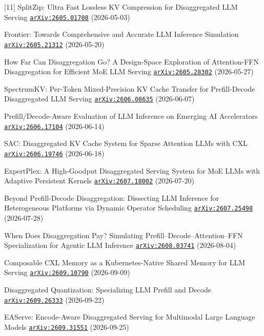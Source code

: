 [11] SplitZip: Ultra Fast Lossless KV Compression for Disaggregated LLM Serving \href{https://arxiv.org/abs/2605.01708}{\texttt{arXiv:2605.01708}} (2026-05-03)\par
[12] Frontier: Towards Comprehensive and Accurate LLM Inference Simulation \href{https://arxiv.org/abs/2605.21312}{\texttt{arXiv:2605.21312}} (2026-05-20)\par
[13] How Far Can Disaggregation Go? A Design-Space Exploration of Attention-FFN Disaggregation for Efficient MoE LLM Serving \href{https://arxiv.org/abs/2605.28302}{\texttt{arXiv:2605.28302}} (2026-05-27)\par
[14] SpectrumKV: Per-Token Mixed-Precision KV Cache Transfer for Prefill-Decode Disaggregated LLM Serving \href{https://arxiv.org/abs/2606.08635}{\texttt{arXiv:2606.08635}} (2026-06-07)\par
[15] Prefill/Decode-Aware Evaluation of LLM Inference on Emerging AI Accelerators \href{https://arxiv.org/abs/2606.17104}{\texttt{arXiv:2606.17104}} (2026-06-14)\par
[16] SAC: Disaggregated KV Cache System for Sparse Attention LLMs with CXL \href{https://arxiv.org/abs/2606.19746}{\texttt{arXiv:2606.19746}} (2026-06-18)\par
[17] ExpertPlex: A High-Goodput Disaggregated Serving System for MoE LLMs with Adaptive Persistent Kernels \href{https://arxiv.org/abs/2607.18002}{\texttt{arXiv:2607.18002}} (2026-07-20)\par
[18] Beyond Prefill-Decode Disaggregation: Dissecting LLM Inference for Heterogeneous Platforms via Dynamic Operator Scheduling \href{https://arxiv.org/abs/2607.25498}{\texttt{arXiv:2607.25498}} (2026-07-28)\par
[19] When Does Disaggregation Pay? Simulating Prefill--Decode--Attention--FFN Specialization for Agentic LLM Inference \href{https://arxiv.org/abs/2608.03741}{\texttt{arXiv:2608.03741}} (2026-08-04)\par
[20] Composable CXL Memory as a Kubernetes-Native Shared Memory for LLM Serving \href{https://arxiv.org/abs/2609.10790}{\texttt{arXiv:2609.10790}} (2026-09-09)\par
[21] Disaggregated Quantization: Specializing LLM Prefill and Decode \href{https://arxiv.org/abs/2609.26333}{\texttt{arXiv:2609.26333}} (2026-09-22)\par
[22] EAServe: Encode-Aware Disaggregated Serving for Multimodal Large Language Models \href{https://arxiv.org/abs/2609.31551}{\texttt{arXiv:2609.31551}} (2026-09-25)\par
